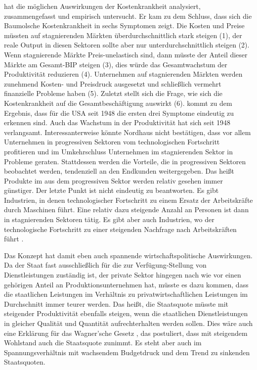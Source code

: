 \textcite{Nordhaus2008} hat die möglichen Auswirkungen der Kostenkrankheit analysiert, zusammengefasst und empirisch untersucht. Er kam zu dem Schluss, dass sich die Baumolsche Kostenkrankheit in sechs Symptomen zeigt. Die Kosten und Preise müssten auf stagnierenden Märkten überdurchschnittlich stark steigen (1), der reale Output in diesen Sektoren sollte aber nur unterdurchschnittlich steigen (2). Wenn stagnierende Märkte Preis-unelastisch sind, dann müsste der Anteil dieser Märkte am Gesamt-BIP steigen (3), dies würde das Gesamtwachstum der Produktivität reduzieren (4). Unternehmen auf stagnierenden Märkten werden zunehmend Kosten- und Preisdruck ausgesetzt und schließlich vermehrt finanzielle Probleme haben (5). Zuletzt stellt sich die Frage, wie sich die Kostenkrankheit auf die Gesamtbeschäftigung auswirkt (6). \textcite{Nordhaus2008} kommt zu dem Ergebnis, dass für die USA seit 1948 die ersten drei Symptome eindeutig zu erkennen sind. Auch das Wachstum in der Produktivität hat sich seit 1948 verlangsamt. Interessanterweise könnte Nordhaus nicht bestätigen, dass vor allem Unternehmen in progressiven Sektoren vom technologischen Fortschritt profitieren und im Umkehrschluss Unternehmen im stagnierenden Sektor in Probleme geraten. Stattdessen werden die Vorteile, die in progressiven Sektoren beobachtet werden, tendenziell an den Endkunden weitergegeben. Das heißt Produkte im aus dem progressiven Sektor werden relativ gesehen immer günstiger. Der letzte Punkt ist nicht eindeutig zu beantworten. Es gibt Industrien, in denen technologischer Fortschritt zu einem Ersatz der Arbeitskräfte durch Maschinen führt. Eine relativ dazu steigende Anzahl an Personen ist dann in stagnierenden Sektoren tätig. Es gibt aber auch Industrien, wo der technologische Fortschritt zu einer steigenden Nachfrage nach Arbeitskräften führt \parencite{Nordhaus2008}.

Das Konzept hat damit eben auch spannende wirtschaftspolitische Auswirkungen. Da der Staat fast ausschließlich für die zur Verfügung-Stellung von Dienstleistungen zuständig ist, der private Sektor hingegen nach wie vor einen gehörigen Anteil an Produktionsunternehmen hat, müsste es dazu kommen, dass die staatlichen Leistungen im Verhältnis zu privatwirtschaftlichen Leistungen im Durchschnitt immer teurer werden. Das heißt, die Staatsquote müsste mit steigender Produktivität ebenfalls steigen, wenn die staatlichen Dienstleistungen in gleicher Qualität und Quantität aufrechterhalten werden sollen. Dies wäre auch eine Erklärung für das Wagner'sche Gesetz \parencite{Wagner1892}, das postuliert, dass mit steigendem Wohlstand auch die Staatsquote zunimmt. Es steht aber auch im Spannungsverhältnis mit wachsendem Budgetdruck und dem Trend zu sinkenden Staatsquoten.

